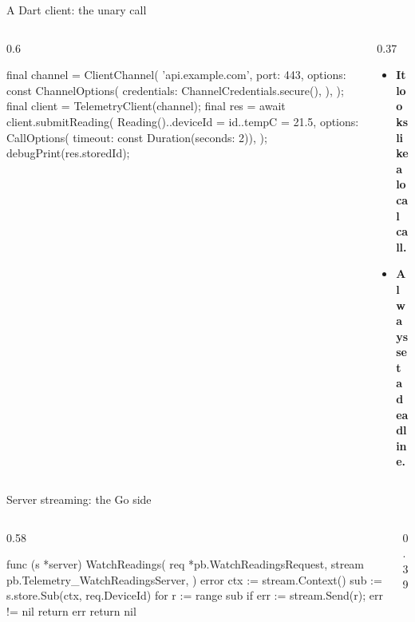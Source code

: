 \documentclass[10pt,aspectratio=169,t]{beamer}
\begin{document}
\begin{frame}[fragile,eyebrow=Implementing]{A Dart client: the unary call}
  \begin{columns}[T]
    \begin{column}{0.6\textwidth}
\begin{dart}
final channel = ClientChannel(
  'api.example.com',
  port: 443,
  options: const ChannelOptions(
    credentials: ChannelCredentials.secure(),
  ),
);
final client = TelemetryClient(channel);
final res = await client.submitReading(
  Reading()..deviceId = id..tempC = 21.5,
  options: CallOptions(
      timeout: const Duration(seconds: 2)),
);
debugPrint(res.storedId);
\end{dart}
    \end{column}
    \begin{column}{0.37\textwidth}
      {
      \begin{itemize}
        \item \textbf{It looks like a local call.} 
        \item \textbf{Always set a deadline.} 
      \end{itemize}}
    \end{column}
  \end{columns}
\end{frame}

\begin{frame}[fragile,eyebrow=Implementing]{Server streaming: the Go side}
  \begin{columns}[T]
    \begin{column}{0.58\textwidth}
\begin{golang}
func (s *server) WatchReadings(
    req *pb.WatchReadingsRequest,
    stream pb.Telemetry_WatchReadingsServer,
) error {
    ctx := stream.Context()
    sub := s.store.Sub(ctx, req.DeviceId)
    for r := range sub {
        if err := stream.Send(r); err != nil {
            return err
        }
    }
    return nil
}
\end{golang}
    \end{column}
    \begin{column}{0.39\textwidth}
    \end{column}
  \end{columns}
\end{frame}
\end{document}
